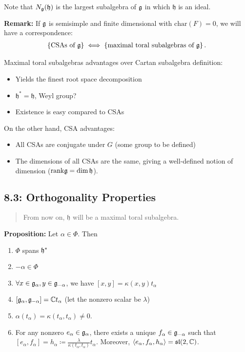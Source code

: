 Note that \(N_{\mathfrak{g}}(\mathfrak h)\) is the largest subalgebra of
\({\mathfrak{g}}\) in which \(\mathfrak h\) is an ideal.

\textbf{Remark:} If \({\mathfrak{g}}\) is semisimple and finite dimensional with
\(\mathrm{char}(F) = 0\), we will have a correspondence: \begin{align*}
\left\{{\text{CSAs of ${\mathfrak{g}}$}}\right\} \iff \left\{{\text{maximal toral subalgebras of ${\mathfrak{g}}$}}\right\}
.\end{align*}

Maximal toral subalgebras advantages over Cartan subalgebra definition:

\begin{itemize}
\tightlist
\item
  Yields the finest root space decomposition
\item
  \(\mathfrak h^* = \mathfrak h\), Weyl group?
\item
  Existence is easy compared to CSAs
\end{itemize}

On the other hand, CSA advantages:

\begin{itemize}
\tightlist
\item
  All CSAs are conjugate under \(G\) (some group to be defined)
\item
  The dimensions of all CSAs are the same, giving a well-defined notion
  of dimension (\(\mathrm{rank} {\mathfrak{g}} = \dim \mathfrak h\)).
\end{itemize}

\hypertarget{orthogonality-properties}{%
\subsection{8.3: Orthogonality
Properties}\label{orthogonality-properties}}

\begin{quote}
From now on, \(\mathfrak h\) will be a maximal toral subalgebra.
\end{quote}

\textbf{Proposition:} Let \(\alpha \in \Phi\). Then

\begin{enumerate}
\def\labelenumi{\alph{enumi}.}
\tightlist
\item
  \(\Phi\) spans \({\mathfrak{h}}^*\)
\item
  \(-\alpha \in \Phi\)
\item
  \(\forall x\in {\mathfrak{g}}_\alpha, y\in{\mathfrak{g}}_{-\alpha}\), we have
  \([x,y] = \kappa(x, y)t_\alpha\)
\item
  \([{\mathfrak{g}}_\alpha, {\mathfrak{g}}_{-\alpha}] = {\mathbb{C}} t_\alpha\) (let the nonzero
  scalar be \(\lambda\))
\item
  \(\alpha(t_\alpha) = \kappa(t_\alpha, t_\alpha) \neq 0\).
\item
  For any nonzero \(e_\alpha \in {\mathfrak{g}}_\alpha\), there exists a unique
  \(f_\alpha \in {\mathfrak{g}}_{-\alpha}\) such that
  \([e_\alpha, f_\alpha] = h_\alpha \coloneqq \frac{\lambda}{\kappa(t_\alpha, t_\alpha)} t_\alpha\).
  Moreover,
  \(\left\langle{e_\alpha, f_\alpha, h_\alpha}\right\rangle = {\mathfrak{sl}}(2, {\mathbb{C}})\).
\end{enumerate}

